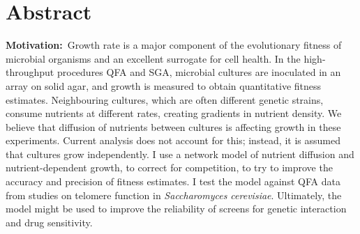 \section*{Abstract}
\label{sec:abstract}


\textbf{Motivation:}~Growth rate is a major component of the
evolutionary fitness of microbial organisms and an excellent surrogate
for cell health.
In the high-throughput procedures QFA and SGA, microbial cultures are
inoculated in an array on solid agar, and growth is measured to obtain
quantitative fitness estimates.
%
%
Neighbouring cultures, which are often different genetic strains,
consume nutrients at different rates, creating gradients in nutrient
density. We believe that diffusion of nutrients between cultures is
affecting growth in these experiments. Current analysis does not
account for this; instead, it is assumed that cultures grow
independently. I use a network model of nutrient diffusion and
nutrient-dependent growth, to correct for competition, to try to
improve the accuracy and precision of fitness estimates. I test the
model against QFA data from studies on telomere function in
\textit{Saccharomyces cerevisiae}. Ultimately, the model might be used
to improve the reliability of screens for genetic interaction and drug
sensitivity.
\\
